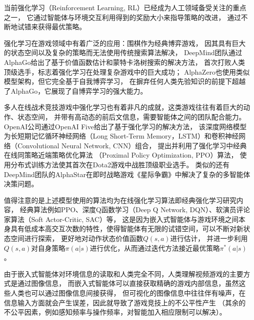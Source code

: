 
当前强化学习（Reinforcement Learning, RL）已经成为人工领域备受关注的重点之一，
它通过智能体与环境交互利用得到的奖励大小来指导策略的改进，
通过不断地试错来获得最优策略。

强化学习在游戏领域中有着广泛的应用：围棋作为经典博弈游戏，
因其具有巨大的状态空间以及复杂的策略而无法使用传统搜索算法解决，
DeepMind团队通过AlphaGo给出了基于价值函数估计和蒙特卡洛树搜索的解决方法，
首次打败人类顶级选手，标志着强化学习在处理复杂游戏中的巨大成功；
AlphaZero也使用类似模型架构，但它完全基于自我博弈学习，
在摒弃任何人类先验知识的前提下超越了AlphaGo，它展现了自博弈学习的强大能力。

多人在线战术竞技游戏中强化学习也有着非凡的成就，这类游戏往往有着巨大的动作、状态空间，
并带有高动态的前后文信息，需要智能体之间的团队配合能力。
OpenAI公司通过OpenAI Five给出了基于强化学习的解决方法，
该深度网络模型为长短期记忆循环神经网络（Long Short-Term Memory，LSTM）和卷积神经网络（Convolutional Neural Network, CNN）组合，
提出并利用了强化学习中经典在线同策略近端策略优化算法
（Proximal Policy Optimization, PPO）算法，
使用分布式训练方法使其首次在Dota2游戏中战胜顶级职业选手。
类似的还有DeepMind团队的AlphaStar在即时战略游戏《星际争霸》中解决了复杂的多智能体决策问题。


值得注意的是上述模型使用的算法均为在线强化学习算法即经典强化学习研究内容，
经典算法例如PPO、深度Q函数学习（Deep Q Network, DQN）、软演员评论家算法（Soft Actor-Critic, SAC）等，
这是因为嵌入式智能体与游戏环境之间本身具有低成本高交互次数的特性，使得智能体有无限的试错空间，可以不断对新状态空间进行探索，
更好地对动作状态价值函数$Q(s,a)$进行估计，
并进一步利用$Q(s,a)$对自身策略$\pi(a|s)$进行优化，从而通过迭代方法接近最优策略$\pi^*(a|s)$。

由于嵌入式智能体对环境信息的读取和人类完全不同，人类理解视频游戏的主要方式是通过图像信息，
而嵌入式智能体可以直接获取精确的游戏内部信息，虽然这些人类也可以通过图像信息间接获得，
但可视化的图像信息中往往伴有噪声，在信息输入方面就会产生误差，因此就导致了游戏竞技上的不公平性产生
（其余的不公平因素，例如感知频率与操作频率，对智能加入相应限制可以解决）。

